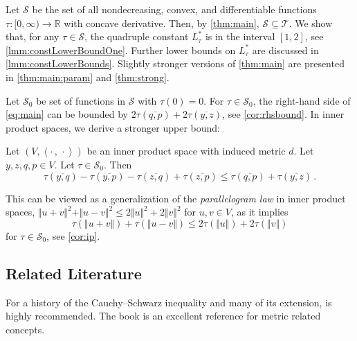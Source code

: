 \documentclass{article}
\renewcommand{\subset}{\subseteq}
\newcommand*{\mc}[1]{\mathcal{#1}}
\newcommand{\R}{\mathbb{R}}
\newcommand{\innerProduct}[2]{\left\langle#1\,,\, #2\right\rangle}
\newcommand{\ip}[2]{\innerProduct{#1}{#2}}
\newcommand{\normof}[1]{\Vert #1 \Vert}
\newcommand{\equationFullstop}{\, .}
\newcommand{\eqfs}{\equationFullstop}
\newcommand{\ol}[2]{\overline{#1,#2}}
\newcommand{\tran}{\tau}
\newcommand{\Tran}{\mc{T}}
\newcommand{\ctransymbol}{L}
\newcommand{\ctranobest}[1]{\ctransymbol_{#1}^{*}}
\newcommand{\ctranbest}{\ctranobest{\tran}}
\newcommand{\setcc}{\mc S}
\newcommand{\setcco}{\mc S_0}
\begin{document}
Let $\setcc$ be the set of all nondecreasing, convex, and differentiable functions $\tran\colon[0,\infty)\to\R$ with concave derivative.
Then, by \cref{thm:main}, $\setcc \subset \Tran$.
We show that, for any $\tran\in\setcc$, the quadruple constant $\ctranbest$ is in the interval $[1, 2]$, see \cref{lmm:constLowerBoundOne}. Further lower bounds on $\ctranbest$ are discussed in \cref{lmm:constLowerBounds}. Slightly stronger versions of \cref{thm:main} are presented in \cref{thm:main:param} and \cref{thm:strong}.

Let $\setcco$ be set of functions in $\setcc$ with $\tran(0)=0$. For $\tran\in\setcco$, the right-hand side of \eqref{eq:main} can be bounded by $2\tran(\ol qp) + 2\tran(\ol yz)$, see \cref{cor:rhsbound}. In inner product spaces, we derive a stronger upper bound:
\begin{theorem}\label{thm:ipsymm}
	Let $(V, \ip\cdot\cdot)$ be an inner product space with induced metric $d$. Let $y,z,q,p\in V$. Let $\tran\in\setcco$. Then
	\begin{equation}\label{eq:symm:tran}
		\tran(\ol yq)  - \tran(\ol yp) - \tran(\ol zq) + \tran(\ol zp) \leq \tran(\ol qp) + \tran(\ol yz)
		\eqfs
	\end{equation}
\end{theorem}
%
This can be viewed as a generalization of the \emph{parallelogram law} in inner product spaces, $\normof{u+v}^2 + \normof{u-v}^2 \leq 2 \normof{u}^2 + 2\normof{v}^2$ for $u,v\in V$, as it implies
\begin{equation}
	\tran(\normof{u+v}) + \tran(\normof{u-v}) \leq  2 \tran(\normof{u}) + 2 \tran(\normof{v}) 
\end{equation}
for $\tran\in\setcco$, see \cref{cor:ip}.
%
%
%
\subsection{Related Literature}
%
For a history of the Cauchy--Schwarz inequality and many of its extension, \cite{steele04} is highly recommended. The book \cite{deza16} is an excellent reference for metric related concepts.
%
%
%
\end{document}
